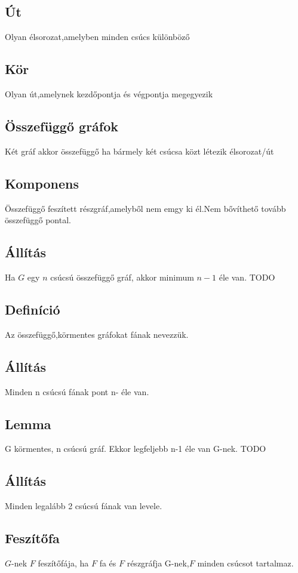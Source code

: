 \documentclass[12pt,a4paper,twoside]{report}
\begin{document}
\subsection{Út}
Olyan élsorozat,amelyben minden csúcs különböző
\subsection{Kör}
Olyan út,amelynek kezdőpontja és végpontja megegyezik
\subsection{Összefüggő gráfok}
Két gráf akkor összefüggő ha bármely két csúcsa közt létezik élsorozat/út
\subsection{Komponens}
Összefüggő feszített részgráf,amelyből nem emgy ki él.Nem bővíthető tovább összefüggő pontal.
\subsection{Állítás}
Ha $G$ egy $n$ csúcsú összefüggő gráf, akkor minimum $n-1$ éle van.
\biz
TODO
\subsection{Definíció}
Az összefüggő,körmentes gráfokat fának nevezzük.
\subsection{Állítás}
Minden n csúcsú fának pont n- éle van.
\subsection{Lemma}
G körmentes, n csúcsú gráf. Ekkor legfeljebb n-1 éle van G-nek.
\biz TODO
\subsection{Állítás}
Minden legalább 2 csúcsú fának van levele.
\subsection{Feszítőfa}
$G$-nek $F$ feszítőfája, ha $F$ fa és $F$ részgráfja G-nek,$F$ minden csúcsot tartalmaz.
\end{document}
